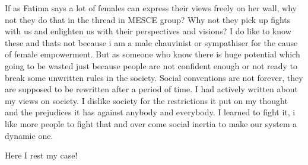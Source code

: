 If as Fatima says a lot of females can express their views freely on her wall, why not they do that in the thread in MESCE group? Why not they pick up fights with us and enlighten us with their perspectives and visions? I do like to know these and thats not because i am a male chauvinist or sympathiser for the cause of female empowerment. But as someone who know there is huge potential which going to be wasted just because people are not confident enough or not ready to break some unwritten rules in the society. Social conventions are not forever, they are supposed to be rewritten after a period of time. I had actively written about my views on society. I dislike society for the restrictions it put on my thought and the prejudices it has against anybody and everybody. I learned to fight it, i like more people to fight that and over come social inertia to make our system a dynamic one.

Here I rest my case!


\newpage
